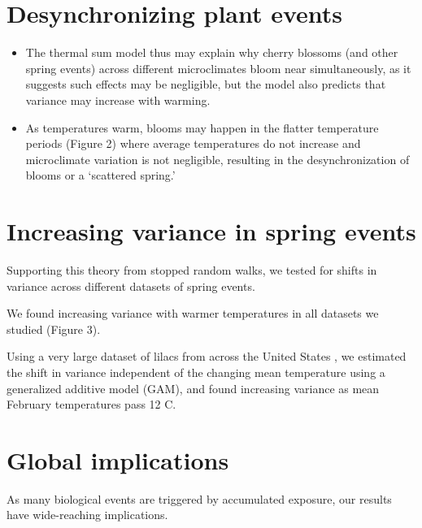 \documentclass[11pt]{article}
\begin{document}
\section*{Desynchronizing plant events}

\begin{itemize}
\item The thermal sum model thus may explain why cherry blossoms (and other spring events) across different microclimates bloom near simultaneously, as it suggests such effects may be negligible, but the model also predicts that variance may increase with warming. 
\item As temperatures warm, blooms may happen in the flatter temperature periods (Figure 2) where average temperatures do not increase and microclimate variation is not negligible, resulting in the desynchronization of blooms or a `scattered spring.'
\end{itemize}

\section*{Increasing variance in spring events}

Supporting this theory from stopped random walks, we tested for shifts in variance across different datasets of spring events. 

We found increasing variance with warmer temperatures in all datasets we studied (Figure 3).

Using a very large dataset of lilacs from across the United States \citep{schwartz2012caprio,rosemartin2015lilac}, we estimated the shift in variance independent of the changing mean temperature using a generalized additive model (GAM), and found increasing variance as mean February temperatures pass 12 \degree C. 

\section*{Global implications}

As many biological events are triggered by accumulated exposure, our results have wide-reaching implications. 
\end{document}
